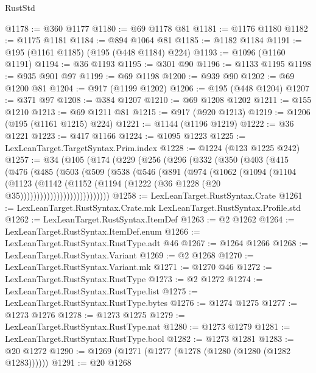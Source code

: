 \begin{lexlean}{RustStd}
\begin{coremodule}
{\begin{coremodule}
{{{{{{{{{{{{{{{{{{{{{{{{{{{{{{@1178 := @360 @1177
@1180 := @69 @1178 @81
@1181 := @1176 @1180
@1182 := @1175 @1181
@1184 := @894 @1064 @81
@1185 := @1182 @1184
@1191 := @195 (@1161 @1185) (@195 (@448 @1184) @224)
@1193 := @1096 (@1160 @1191)
@1194 := @36 @1193
@1195 := @301 @90
@1196 := @1133 @1195
@1198 := @935 @901 @97
@1199 := @69 @1198
@1200 := @939 @90
@1202 := @69 @1200 @81
@1204 := @917 (@1199 @1202)
@1206 := @195 (@448 @1204)
@1207 := @371 @97
@1208 := @384 @1207
@1210 := @69 @1208 @1202
@1211 := @155 @1210
@1213 := @69 @1211 @81
@1215 := @917 (@920 @1213)
@1219 := @1206 (@195 (@1161 @1215) @224)
@1221 := @1144 (@1196 @1219)
@1222 := @36 @1221
@1223 := @417 @1166
@1224 := @1095 @1223
@1225 := LexLeanTarget.TargetSyntax.Prim.index
@1228 := @1224 (@123 @1225 @242)
@1257 := @34
    (@105
      (@174
        (@229
          (@256
            (@296
              (@332
                (@350
                  (@403
                    (@415
                      (@476
                        (@485
                          (@503
                            (@509
                              (@538
                                (@546
                                  (@891
                                    (@974
                                      (@1062
                                        (@1094
                                          (@1104
                                            (@1123
                                              (@1142
                                                (@1152
                                                  (@1194
                                                    (@1222
                                                      (@36 @1228 (@20 @35)))))))))))))))))))))))))))
@1258 := LexLeanTarget.RustSyntax.Crate
@1261 := LexLeanTarget.RustSyntax.Crate.mk LexLeanTarget.RustSyntax.Profile.std
@1262 := LexLeanTarget.RustSyntax.ItemDef
@1263 := @2 @1262
@1264 := LexLeanTarget.RustSyntax.ItemDef.enum
@1266 := LexLeanTarget.RustSyntax.RustType.adt @46
@1267 := @1264 @1266
@1268 := LexLeanTarget.RustSyntax.Variant
@1269 := @2 @1268
@1270 := LexLeanTarget.RustSyntax.Variant.mk
@1271 := @1270 @46
@1272 := LexLeanTarget.RustSyntax.RustType
@1273 := @2 @1272
@1274 := LexLeanTarget.RustSyntax.RustType.list
@1275 := LexLeanTarget.RustSyntax.RustType.bytes
@1276 := @1274 @1275
@1277 := @1273 @1276
@1278 := @1273 @1275
@1279 := LexLeanTarget.RustSyntax.RustType.nat
@1280 := @1273 @1279
@1281 := LexLeanTarget.RustSyntax.RustType.bool
@1282 := @1273 @1281
@1283 := @20 @1272
@1290 := @1269 (@1271 (@1277 (@1278 (@1280 (@1280 (@1282 @1283))))))
@1291 := @20 @1268
}}}}}}}}}}}}}}}}}}}}}}}}}}}}}}
\end{coremodule}}
\end{coremodule}
\end{lexlean}
